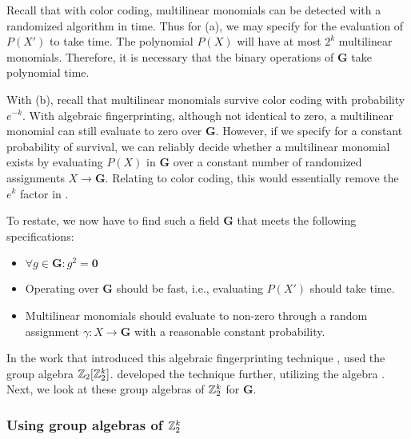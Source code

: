Recall that with color coding, multilinear monomials can be detected with a 
randomized algorithm in  time. Thus for (a), we may specify for 
the evaluation of $P(X')$ to take  time. The polynomial $P(X)$ 
will have at most $2^k$ multilinear monomials. Therefore, 
it is necessary that the binary operations 
of $\mathbf{G}$ take polynomial time.

With (b), recall that multilinear monomials 
survive color coding with probability $e^{-k}$. 
With algebraic fingerprinting, although not identical to zero, a multilinear monomial 
can still evaluate to zero over $\mathbf{G}$. 
However, if we specify for a constant 
probability of survival, we can reliably decide whether a multilinear monomial exists 
by evaluating $P(X)$ in $\mathbf{G}$ over a constant number of 
randomized assignments $X \to \mathbf{G}$. Relating to color coding, 
this would essentially remove the 
$e^k$ factor in .

To restate, we now have to find such a field $\mathbf{G}$ that 
meets the following specifications: 
\begin{itemize}
  \item $\forall g \in \mathbf{G} \colon g^2 = \mathbf{0}$
  \item Operating over $\mathbf{G}$ should be fast, i.e., evaluating 
  $P(X')$ should take  time.
  \item Multilinear monomials should evaluate to non-zero
  through a random assignment 
  $\gamma \colon X \to \mathbf{G}$ with a reasonable constant probability.
\end{itemize}

In the work that introduced 
this algebraic fingerprinting technique \cite{Koutis08}, 
\citeauthor{Koutis08} used the group algebra $\mathbb Z_2[\mathbb Z_2^k]$. 
\citeauthor{Williams09} developed the technique further, 
utilizing the algebra
\cite{Williams09}. 
Next, we look at these 
group algebras of $\mathbb Z_2^k$ for $\mathbf{G}$. 

\subsubsection{Using group algebras of $\mathbb Z_2^k$}

